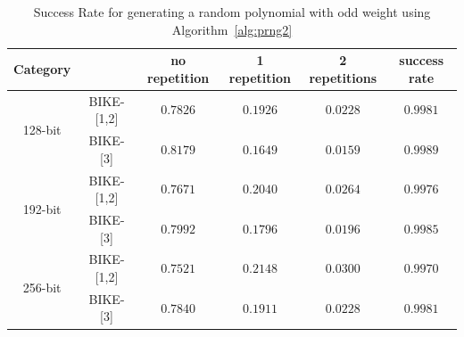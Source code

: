 \documentclass[runningheads]{llncs}
\begin{document}

\begin{table}[!tb]\centering
\caption{Success Rate for generating a random polynomial with odd weight using Algorithm~\ref{alg:prng2}}\label{table:success_rate}
\begin{tabular}{cc|cccc}
  \hline
 \textbf{Category}        &             & no repetition & 1 repetition & 2 repetitions & success rate \\\hline
\multirow{ 2}{*}{128-bit} &  BIKE-[1,2] & $0.7826$ & $0.1926$  & $0.0228$  & $0.9981$\\
                    &  BIKE-[3] & $0.8179$ & $0.1649$  & $0.0159$  & $0.9989$\\
  \hline
\multirow{ 2}{*}{192-bit} &  BIKE-[1,2] & $0.7671$ & $0.2040$  & $0.0264$  & $0.9976$\\
                    &  BIKE-[3] & $0.7992$ & $0.1796$  & $0.0196$  & $0.9985$\\
  \hline
\multirow{ 2}{*}{256-bit} &  BIKE-[1,2] & $0.7521$ & $0.2148$  & $0.0300$  & $0.9970$\\
                    &  BIKE-[3] & $0.7840$ & $0.1911$  & $0.0228$  & $0.9981$\\
  \hline
\end{tabular}
\vspace{-4mm}
\end{table}
\end{document}
